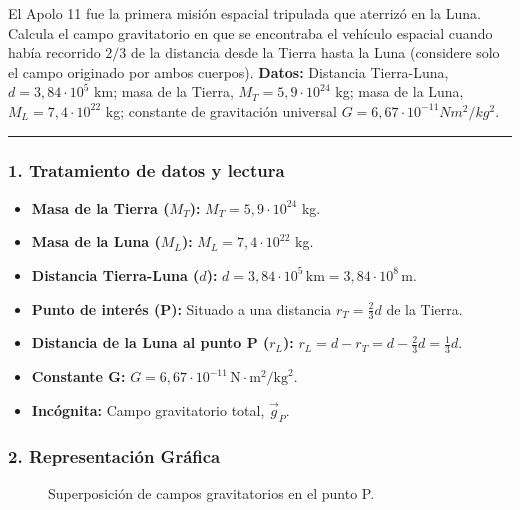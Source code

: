 \begin{cajaenunciado}
El Apolo 11 fue la primera misión espacial tripulada que aterrizó en la Luna. Calcula el campo gravitatorio en que se encontraba el vehículo espacial cuando había recorrido $2/3$ de la distancia desde la Tierra hasta la Luna (considere solo el campo originado por ambos cuerpos).
\textbf{Datos:} Distancia Tierra-Luna, $d=3,84\cdot10^{5}$ km; masa de la Tierra, $M_{T}=5,9\cdot10^{24}$ kg; masa de la Luna, $M_{L}=7,4\cdot10^{22}$ kg; constante de gravitación universal $G=6,67\cdot10^{-11}Nm^{2}/kg^{2}$.
\end{cajaenunciado}
\hrule

\subsubsection*{1. Tratamiento de datos y lectura}
\begin{itemize}
    \item \textbf{Masa de la Tierra ($M_T$):} $M_T = 5,9 \cdot 10^{24}$ kg.
    \item \textbf{Masa de la Luna ($M_L$):} $M_L = 7,4 \cdot 10^{22}$ kg.
    \item \textbf{Distancia Tierra-Luna ($d$):} $d = 3,84 \cdot 10^5 \, \text{km} = 3,84 \cdot 10^8 \, \text{m}$.
    \item \textbf{Punto de interés (P):} Situado a una distancia $r_T = \frac{2}{3}d$ de la Tierra.
    \item \textbf{Distancia de la Luna al punto P ($r_L$):} $r_L = d - r_T = d - \frac{2}{3}d = \frac{1}{3}d$.
    \item \textbf{Constante G:} $G = 6,67 \cdot 10^{-11} \, \text{N}\cdot\text{m}^2/\text{kg}^2$.
    \item \textbf{Incógnita:} Campo gravitatorio total, $\vec{g}_P$.
\end{itemize}

\subsubsection*{2. Representación Gráfica}
\begin{figure}[H]
    \centering
    \caption{Superposición de campos gravitatorios en el punto P.}
\end{figure}

